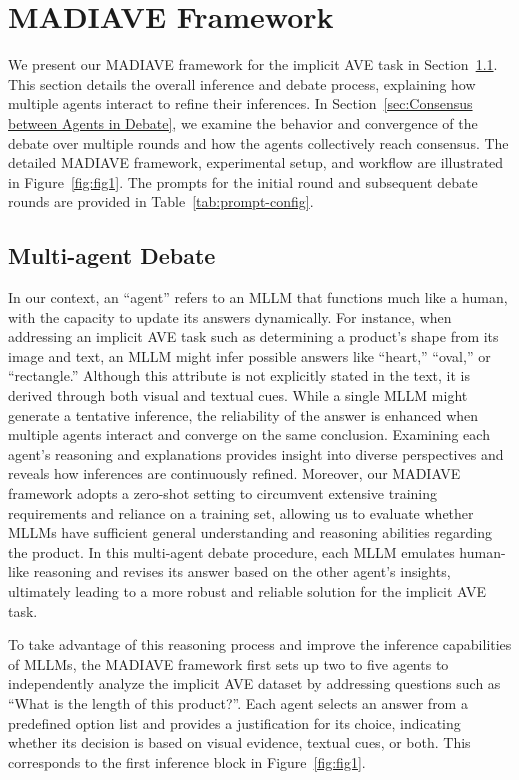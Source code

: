 \documentclass[11pt]{article}
\newcommand{\modelname}{MADIAVE}
\begin{document}
\section{MADIAVE Framework}
\label{sec:Implicit AVE through Multiagent Debate}

We present our \textsc{\modelname} framework for the implicit AVE task in Section~\ref{sec:Multiagent Debate}. This section details the overall inference and debate process, explaining how multiple agents interact to refine their inferences. In Section~\ref{sec:Consensus between Agents in Debate}, we examine the behavior and convergence of the debate over multiple rounds and how the agents collectively reach consensus. The detailed \textsc{\modelname} framework, experimental setup, and workflow are illustrated in Figure~\ref{fig:fig1}. The prompts for the initial round and subsequent debate rounds are provided in Table~\ref{tab:prompt-config}.

\subsection{Multi-agent Debate}
\label{sec:Multiagent Debate}

In our context, an “agent” refers to an MLLM that functions much like a human, with the capacity to update its answers dynamically. For instance, when addressing an implicit AVE task such as determining a product’s shape from its image and text, an MLLM might infer possible answers like “heart,” “oval,” or “rectangle.” Although this attribute is not explicitly stated in the text, it is derived through both visual and textual cues. While a single MLLM might generate a tentative inference, the reliability of the answer is enhanced when multiple agents interact and converge on the same conclusion. Examining each agent’s reasoning and explanations provides insight into diverse perspectives and reveals how inferences are continuously refined. Moreover, our \textsc{\modelname} framework adopts a zero-shot setting to circumvent extensive training requirements and reliance on a training set, allowing us to evaluate whether MLLMs have sufficient general understanding and reasoning abilities regarding the product. In this multi-agent debate procedure, each MLLM emulates human-like reasoning and revises its answer based on the other agent's insights, ultimately leading to a more robust and reliable solution for the implicit AVE task.

To take advantage of this reasoning process and improve the inference capabilities of MLLMs, the \textsc{\modelname} framework first sets up two to five agents to independently analyze the implicit AVE dataset \cite{zou2024implicitaveopensourcedatasetmultimodal} by addressing questions such as ``What is the length of this product?''. Each agent selects an answer from a predefined option list and provides a justification for its choice, indicating whether its decision is based on visual evidence, textual cues, or both. This corresponds to the first inference block in Figure~\ref{fig:fig1}. 
\end{document}
